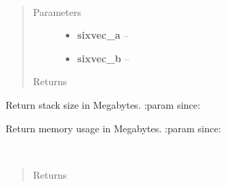 \documentclass[letterpaper,10pt,english]{sphinxmanual}
\begin{document}

\begin{fulllineitems}
\label{index:aietes.Tools.spherical_distance}~\begin{quote}\begin{description}
\item[{Parameters}] \leavevmode\begin{itemize}
\item {} 
\textbf{sixvec\_a} -- 

\item {} 
\textbf{sixvec\_b} -- 

\end{itemize}

\item[{Returns}] \leavevmode


\end{description}\end{quote}

\end{fulllineitems}


\begin{fulllineitems}
\label{index:aietes.Tools.stacksize}
Return stack size in Megabytes.
:param since:

\end{fulllineitems}


\begin{fulllineitems}
\label{index:aietes.Tools.swapsize}
Return memory usage in Megabytes.
:param since:

\end{fulllineitems}


\begin{fulllineitems}
\label{index:aietes.Tools.timeit}~\begin{quote}\begin{description}
\item[{Returns}] \leavevmode


\end{description}\end{quote}

\end{fulllineitems}
\end{document}
